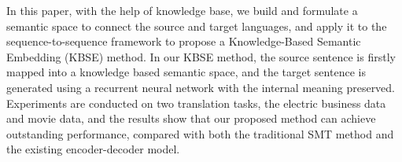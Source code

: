 In this paper, with the help of knowledge base, we build and formulate a semantic space to connect the source and target languages, and apply it to the sequence-to-sequence framework to propose a Knowledge-Based Semantic Embedding (KBSE) method. In our KBSE method, the source sentence is firstly mapped into a knowledge based semantic space, and the target sentence is generated using a recurrent neural network with the internal meaning preserved.  Experiments are conducted on two translation tasks, the electric business data and movie data, and the results show that our proposed method can achieve outstanding performance, compared with both the traditional SMT method and the existing encoder-decoder model.
